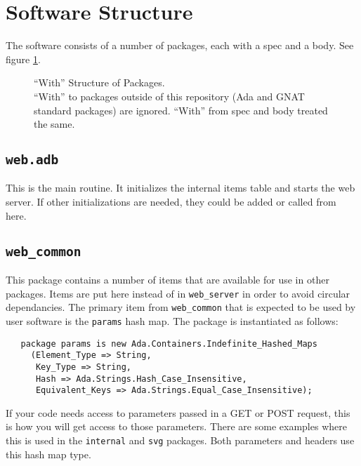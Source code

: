 \documentclass[10pt, openany, draft]{article}
\begin{document}
\section{Software Structure}
The software consists of a number of packages, each with a spec and a body.  See figure \ref{fig:With}.
\begin{figure}
  \centering
  
  \caption{``With'' Structure of Packages.\\  ``With'' to packages outside of this repository (Ada and GNAT standard packages) are ignored.  ``With'' from spec and body treated the same.}
  \label{fig:With}
\end{figure}

\subsection{\texttt{web.adb}}
This is the main routine.  It initializes the internal items table and starts the web server.  If other initializations are needed, they could be added or called from here.

\subsection{\texttt{web\_common}}
This package contains a number of items that are available for use in other packages.  Items are put here instead of in \texttt{web\_server} in order to avoid circular dependancies.  The primary item from \texttt{web\_common} that is expected to be used by user software is the \texttt{params} hash map.  The package is instantiated as follows:
\begin{verbatim}
   package params is new Ada.Containers.Indefinite_Hashed_Maps
     (Element_Type => String,
      Key_Type => String,
      Hash => Ada.Strings.Hash_Case_Insensitive,
      Equivalent_Keys => Ada.Strings.Equal_Case_Insensitive);
\end{verbatim}
If your code needs access to parameters passed in a GET or POST request, this is how you will get access to those parameters.  There are some examples where this is used in the \texttt{internal} and \texttt{svg} packages.  Both parameters and headers use this hash map type.
\end{document}
